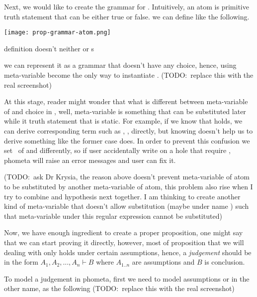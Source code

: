 \documentclass[master.tex]{subfiles}
\begin{document}
Next, we would like to create the grammar for . Intuitively, an atom
is primitive truth statement that can be either true or false. we can define
 like the following.

\centerline{\texttt{[image: prop-grammar-atom.png]}}

 definition doesn't neither \kMetaVarRegex{} or \kChoice{}s

we can represent
it as a grammar that doesn't have any choice, hence, using meta-variable become
the only way to instantiate . (TODO:\ replace this with the real
screenshot)

At this stage, reader might wonder that what is different between meta-variable
of  and  choice in , well, meta-variable is
something that can be substituted later while  it truth statement that
is static. For example,
if we know that  holds, we can derive
corresponding term such as \bat{\propTop\propOr\bat{\propNot\propTop}},
,
directly, but knowing
 doesn't
help us to derive something like the former case does. In order to prevent this
confusion we set \kVarRegex\ of  and  differently, so if
user accidentally write  on a hole that require , phometa
will raise an error messages and user can fix it.

(TODO:\ ask Dr Krysia, the reason above doesn't prevent meta-variable of atom to
be substituted by another meta-variable of atom, this problem also rise when I
try to combine  and hypothesis next together. I am
thinking to create another kind of meta-variable that doesn't allow substitution
(maybe under name ) such that meta-variable under this regular
expression cannot be substituted)

Now, we have enough ingredient to create a proper proposition, one might say
that we can start proving it directly, however, most of proposition that we will
dealing with only holds under certain assumptions, hence, a \emph{judgement}
should be in the form $A_1, A_2, ..., A_n \vdash B$ where $A_{1..n}$ are
assumptions and $B$ is conclusion.

To model a judgement in phometa, first we need to model assumptions or in the
other name,  as the following (TODO:\ replace this with the real
screenshot)
\end{document}
